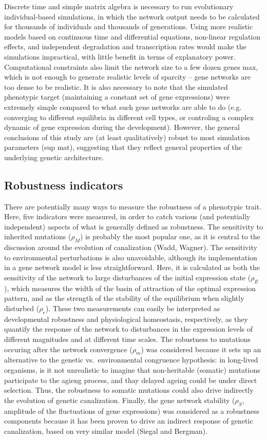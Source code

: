 \documentclass[a4paper]{article}
\newcommand{\stability}{{\rho_S}}
\newcommand{\earlyenv}{{\rho_E}}
\newcommand{\lateenv}{{\rho_e}}
\newcommand{\earlymut}{{\rho_M}}
\newcommand{\latemut}{{\rho_m}}
\begin{document}
Discrete time and simple matrix algebra is necessary to run evolutionary individual-based simulations, in which the network output needs to be calculated for thousands of individuals and thousands of generations. Using more realistic models based on continuous time and differential equations, non-linear regulation effects, and independent degradation and transcription rates would make the simulations impractical, with little benefit in terms of explanatory power. Computational constraints also limit the network size to a few dozen genes max, which is not enough to generate realistic levels of sparcity -- gene networks are too dense to be realistic. It is also necessary to note that the simulated phenotypic target (maintaining a constant set of gene expressions) were extremely simple compared to what such gene networks are able to do (e.g. converging to different equilibria in different cell types, or controling a complex dynamic of gene expression during the development). However, the general conclusions of this study are (at least qualitatively) robust to most simulation parameters (sup mat), suggesting that they reflect general properties of the underlying genetic architecture. 

\subsection{Robustness indicators}

There are potentially many ways to measure the robustness of a phenotypic trait. Here, five indicators were measured, in order to catch various (and potentially independent) aspects of what is generally defined as robustness. The sensitivity to inherited mutations ($\earlymut$) is probably the most popular one, as it is central to the discussion around the evolution of canalization (Wadd, Wagner). The sensitivity to environmental perturbations is also unavoidable, although its implementation in a gene network model is less straightforward. Here, it is calculated as both the sensitivity of the network to large disturbances of the initial expression state ($\earlyenv$), which measures the width of the basin of attraction of the optimal expression pattern, and as the strength of the stability of the equilibrium when slightly disturbed ($\lateenv$). These two measurements can easily be interpreted as developmental robustness and physiological homeostasis, respectively, as they quantify the response of the network to disturbances in the expression levels of different magnitudes and at different time scales. The robustness to mutations occuring after the network convergence ($\latemut$) was considered because it sets up an alternative to the genetic vs.\ environmental congruence hypothesis: in long-lived organisms, is it not unrealistic to imagine that non-heritable (somatic) mutations participate to the agieng process, and thay delayed ageing could be under direct selection. Thus, the robustness to somatic mutations could also drive indirectly the evolution of genetic canalization. Finally, the gene network stability ($\stability$, amplitude of the fluctuations of gene expressions) was considered as a robustness components because it has been proven to drive an indirect response of genetic canalization, based on very similar model (Siegal and Bergman). 
\end{document}
